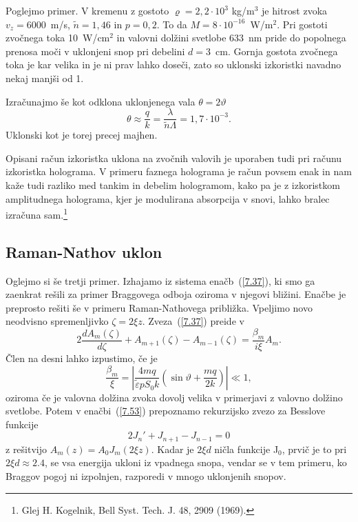 Poglejmo primer. V kremenu z gostoto $\varrho=2,2\cdot10^{3}$ kg/m$^{3}$ je hitrost zvoka $v_{z}=6000$~m/s,
$\tilde{n}=1,46$ in $p=0,2$. To da $M=8\cdot10^{-16}$~W/m$^{2}$.
Pri gostoti zvočnega toka 10~W/cm$^{2}$ in valovni dolžini svetlobe 633~nm
pride do popolnega prenosa moči v uklonjeni snop pri debelini $d=3$~cm. Gornja gostota
zvočnega toka je kar velika in je ni prav lahko doseči, zato so 
uklonski izkoristki navadno nekaj manjši od 1.

Izračunajmo še kot odklona uklonjenega vala $\theta = 2 \vartheta$  
\begin{equation}
\theta \approx \frac{q}{k}=\frac{\lambda}{\tilde{n}\Lambda}=1,7\cdot10^{-3}.
\label{7.52}
\end{equation}
Uklonski kot je torej precej majhen.

\begin{remark}
Opisani račun izkoristka uklona na zvočnih valovih je uporaben tudi
pri računu izkoristka holograma. V primeru faznega holograma je račun
povsem enak in nam kaže tudi razliko med tankim in debelim hologramom,
kako pa je z izkoristkom amplitudnega holograma, kjer je modulirana
absorpcija v snovi, lahko bralec izračuna sam.\footnote{Glej H. Kogelnik, Bell Syst. Tech. J.
48, 2909 (1969).}
\end{remark}

\subsection*{Raman-Nathov uklon}
Oglejmo si še tretji primer. Izhajamo iz sistema enačb~(\ref{7.37}), ki smo ga 
zaenkrat rešili za primer Braggovega odboja oziroma v njegovi bližini. 
Enačbe je preprosto rešiti še v primeru Raman-Nathovega približka. 
Vpeljimo novo neodvisno spremenljivko $\zeta=2\xi z$. 
Zveza~(\ref{7.37})
preide v 
\begin{equation}
2\frac{dA_{m}(\zeta)}{d\zeta}+A_{m+1}(\zeta)-A_{m-1}(\zeta)=\frac{\beta_{m}}{i\xi}A_{m}.
\label{7.53}
\end{equation}
 Člen na desni lahko izpustimo, če je 
\begin{equation}
\frac{\beta_{m}}{\xi}=\left| \frac{4mq}{\tilde{\varepsilon}pS_0k}(\sin\vartheta+\frac{mq}{2k})\right| 
\ll 1,
\label{7.54}
\end{equation}
oziroma če je valovna dolžina zvoka dovolj velika v primerjavi z valovno dolžino svetlobe. Potem 
v enačbi~(\ref{7.53}) prepoznamo rekurzijsko zvezo za Besslove funkcije 
\begin{equation}
2J_{n}'+J_{n+1}-J_{n-1}=0
\label{7.55}
\end{equation}
z rešitvijo $A_{m}(z)=A_{0}J_{m}(2\xi z)$. Kadar je $2\xi d$ ničla funkcije
J$_{0}$, prvič je to pri $2\xi d\approx 2.4$, se vsa energija ukloni iz
vpadnega snopa, vendar se v tem primeru, ko Braggov pogoj ni izpolnjen,
razporedi v mnogo uklonjenih snopov.


